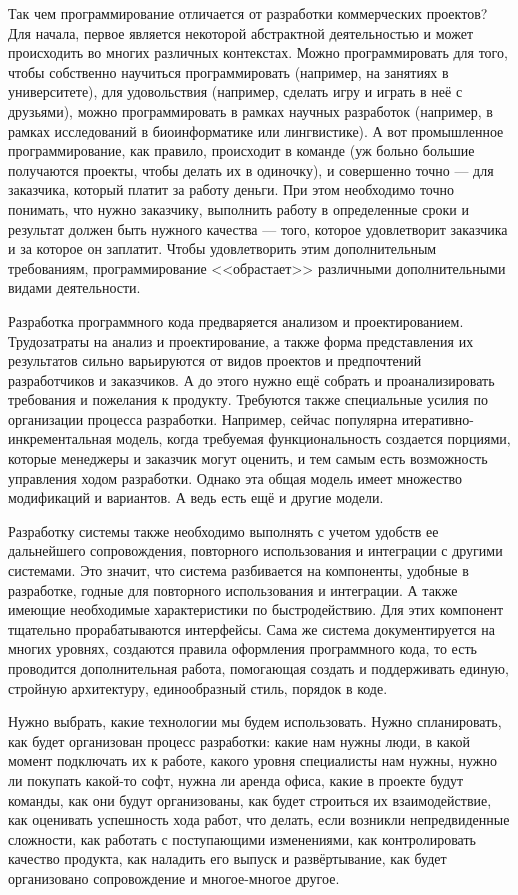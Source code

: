 \documentclass{../../text-style}
\begin{document}
Так чем программирование отличается от разработки коммерческих проектов? Для начала, первое является некоторой абстрактной деятельностью и может происходить во многих различных контекстах. Можно программировать для того, чтобы собственно научиться программировать (например, на занятиях в университете), для удовольствия (например, сделать игру и играть в неё с друзьями), можно программировать в рамках научных разработок (например, в рамках исследований в биоинформатике или лингвистике). А вот промышленное программирование, как правило, происходит в команде (уж больно большие получаются проекты, чтобы делать их в одиночку), и совершенно точно --- для заказчика, который платит за работу деньги. При этом необходимо точно понимать, что нужно заказчику, выполнить работу в определенные сроки и результат должен быть нужного качества --- того, которое удовлетворит заказчика и за которое он заплатит. Чтобы удовлетворить этим дополнительным требованиям, программирование <<обрастает>> различными дополнительными видами деятельности.

Разработка программного кода предваряется анализом и проектированием. Трудозатраты на анализ и проектирование, а также форма представления их результатов сильно варьируются от видов проектов и предпочтений разработчиков и заказчиков. А до этого нужно ещё собрать и проанализировать требования и пожелания к продукту. Требуются также специальные усилия по организации процесса разработки. Например, сейчас популярна итеративно-инкрементальная модель, когда требуемая функциональность создается порциями, которые менеджеры и заказчик могут оценить, и тем самым есть возможность управления ходом разработки. Однако эта общая модель имеет множество модификаций и вариантов. А ведь есть ещё и другие модели.

Разработку системы также необходимо выполнять с учетом удобств ее дальнейшего сопровождения, повторного использования и интеграции с другими системами. Это значит, что система разбивается на компоненты, удобные в разработке, годные для повторного использования и интеграции. А также имеющие необходимые характеристики по быстродействию. Для этих компонент тщательно прорабатываются интерфейсы. Сама же система документируется на многих уровнях, создаются правила оформления программного кода, то есть проводится дополнительная работа, помогающая создать и поддерживать единую, стройную архитектуру, единообразный стиль, порядок в коде.

Нужно выбрать, какие технологии мы будем использовать. Нужно спланировать, как будет организован процесс разработки: какие нам нужны люди, в какой момент подключать их к работе, какого уровня специалисты нам нужны, нужно ли покупать какой-то софт, нужна ли аренда офиса, какие в проекте будут команды, как они будут организованы, как будет строиться их взаимодействие, как оценивать успешность хода работ, что делать, если возникли непредвиденные сложности, как работать с поступающими изменениями, как контролировать качество продукта, как наладить его выпуск и развёртывание, как будет организовано сопровождение и многое-многое другое.
\end{document}
